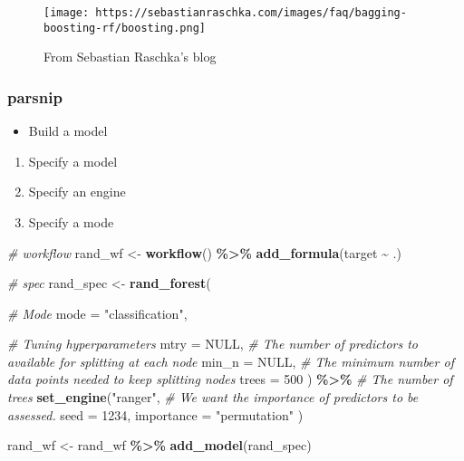 \documentclass[
]{book}
\newenvironment{Shaded}{\begin{snugshade}}{\end{snugshade}}
\newcommand{\CommentTok}[1]{\textcolor[rgb]{0.56,0.35,0.01}{\textit{#1}}}
\newcommand{\DataTypeTok}[1]{\textcolor[rgb]{0.13,0.29,0.53}{#1}}
\newcommand{\DecValTok}[1]{\textcolor[rgb]{0.00,0.00,0.81}{#1}}
\newcommand{\KeywordTok}[1]{\textcolor[rgb]{0.13,0.29,0.53}{\textbf{#1}}}
\newcommand{\NormalTok}[1]{#1}
\newcommand{\OperatorTok}[1]{\textcolor[rgb]{0.81,0.36,0.00}{\textbf{#1}}}
\newcommand{\OtherTok}[1]{\textcolor[rgb]{0.56,0.35,0.01}{#1}}
\newcommand{\StringTok}[1]{\textcolor[rgb]{0.31,0.60,0.02}{#1}}
\providecommand{\tightlist}{%
  \setlength{\itemsep}{0pt}\setlength{\parskip}{0pt}}
\begin{document}
\begin{figure}
\centering
\texttt{[image: https://sebastianraschka.com/images/faq/bagging-boosting-rf/boosting.png]}
\caption{From Sebastian Raschka's blog}
\end{figure}

\hypertarget{parsnip-2}{%
\subsubsection{parsnip}\label{parsnip-2}}

\begin{itemize}
\tightlist
\item
  Build a model
\end{itemize}

\begin{enumerate}
\def\labelenumi{\arabic{enumi}.}
\tightlist
\item
  Specify a model
\item
  Specify an engine
\item
  Specify a mode
\end{enumerate}

\begin{Shaded}
\begin{Highlighting}[]
\CommentTok{\# workflow}
\NormalTok{rand\_wf \textless{}{-}}\StringTok{ }\KeywordTok{workflow}\NormalTok{() }\OperatorTok{\%\textgreater{}\%}\StringTok{ }\KeywordTok{add\_formula}\NormalTok{(target }\OperatorTok{\textasciitilde{}}\StringTok{ }\NormalTok{.)}

\CommentTok{\# spec}
\NormalTok{rand\_spec \textless{}{-}}\StringTok{ }\KeywordTok{rand\_forest}\NormalTok{(}

  \CommentTok{\# Mode}
  \DataTypeTok{mode =} \StringTok{"classification"}\NormalTok{,}

  \CommentTok{\# Tuning hyperparameters}
  \DataTypeTok{mtry =} \OtherTok{NULL}\NormalTok{, }\CommentTok{\# The number of predictors to available for splitting at each node}
  \DataTypeTok{min\_n =} \OtherTok{NULL}\NormalTok{, }\CommentTok{\# The minimum number of data points needed to keep splitting nodes}
  \DataTypeTok{trees =} \DecValTok{500}
\NormalTok{) }\OperatorTok{\%\textgreater{}\%}\StringTok{ }\CommentTok{\# The number of trees}
\StringTok{  }\KeywordTok{set\_engine}\NormalTok{(}\StringTok{"ranger"}\NormalTok{,}
    \CommentTok{\# We want the importance of predictors to be assessed.}
    \DataTypeTok{seed =} \DecValTok{1234}\NormalTok{,}
    \DataTypeTok{importance =} \StringTok{"permutation"}
\NormalTok{  )}

\NormalTok{rand\_wf \textless{}{-}}\StringTok{ }\NormalTok{rand\_wf }\OperatorTok{\%\textgreater{}\%}\StringTok{ }\KeywordTok{add\_model}\NormalTok{(rand\_spec)}
\end{Highlighting}
\end{Shaded}
\end{document}
